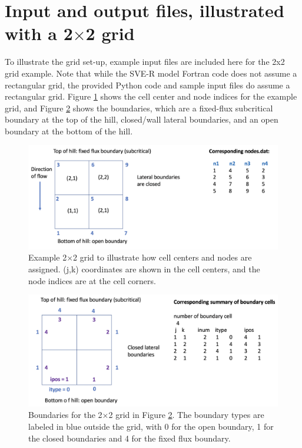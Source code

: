 \documentclass{article}
\newcommand{\code}[1]{\texttt{#1}}
\begin{document}
\section{Input and output files, illustrated with a 2$\times$2 grid}


%	
	 

To illustrate the grid set-up, example input files are included here for the 2x2 grid example.  Note that while the SVE-R model Fortran code does not assume a  rectangular grid, the provided Python code and sample input files do assume a rectangular grid. 
 Figure \ref{2by2} shows the cell center and node indices for the example grid, and Figure \ref{2by2boundary} shows the boundaries, which are a fixed-flux subcritical boundary at the top of the hill, closed/wall lateral boundaries, and an open boundary at the bottom of the hill.


 \begin{figure}[h]
 \centering
\includegraphics[width=30pc]{grid/2by2nodes.png}
 \caption{Example 2$\times$2 grid to illustrate how cell centers and nodes are assigned.  (j,k) coordinates are shown in the cell centers, and the node indices are at the cell corners. }
 \label{2by2}
 \end{figure}
 
 \begin{figure}[h]
 \centering
\includegraphics[width=30pc]{grid/2by2boundary.png}
 \caption{Boundaries for the 2$\times$2 grid in Figure \ref{2by2boundary}. The boundary types are labeled in blue outside the grid, with 0 for the open boundary, 1 for the closed boundaries and 4 for the fixed flux boundary.  }
 \label{2by2boundary}
 \end{figure}
 
\end{document}
